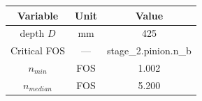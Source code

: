 \begin{tabular}{|c|c|c|}
\hline
Variable & Unit & Value \\ \hline

depth $D$ & mm & 425 \\ \hline
Critical FOS & --- & stage\_2.pinion.n\_b \\ \hline
$n_{min}$ & FOS & 1.002 \\ \hline
$n_{median}$ & FOS & 5.200 \\ \hline

\end{tabular}
